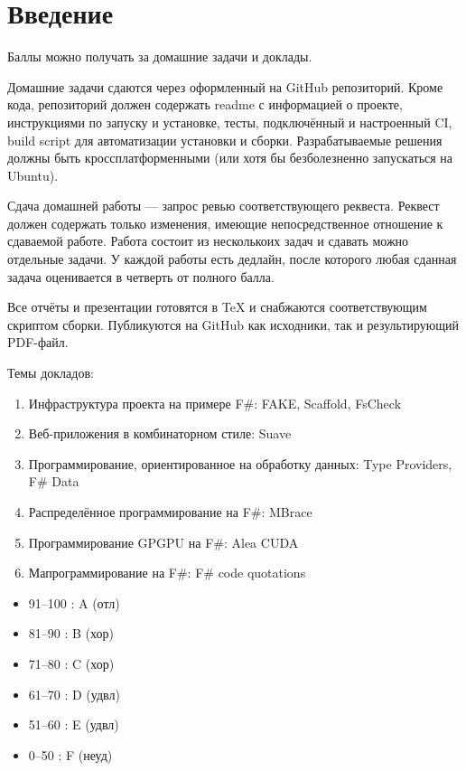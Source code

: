 \section{Введение}

Баллы можно получать за домашние задачи и доклады.

Домашние задачи сдаются через оформленный на GitHub репозиторий. Кроме кода, репозиторий должен содержать readme с информацией о проекте, инструкциями по запуску и установке, тесты, подключённый и настроенный CI, build script для автоматизации установки и сборки. Разрабатываемые решения должны быть кроссплатформенными (или хотя бы безболезненно запускаться на Ubuntu).

Сдача домашней работы --- запрос ревью соответствующего реквеста. Реквест должен содержать только изменения, имеющие непосредственное отношение к сдаваемой работе. Работа состоит из несколькоих задач и сдавать можно отдельные задачи. У каждой работы есть дедлайн, после которого любая сданная задача оценивается в четверть от полного балла.

Все отчёты и презентации готовятся в TeX и снабжаются соответствующим скриптом сборки. Публикуются на GitHub как исходники, так и результирующий PDF-файл.

Темы докладов:
    \begin{enumerate}
    	\item Инфраструктура проекта на примере F\#: FAKE, Scaffold, FsCheck    
    	\item Веб-приложения в комбинаторном стиле: Suave
        \item Программирование, ориентированное на обработку данных: Type Providers, F\# Data
        \item Распределённое программирование на F\#: MBrace  
        \item Программирование GPGPU на F\#: Alea CUDA
    	\item Мапрограммирование на F\#: F\# code quotations
    \end{enumerate}

\begin{itemize}
   \item 91--100 : A (отл)
   \item 81--90 : B (хор)
   \item 71--80 : C (хор)
   \item 61--70 : D (удвл)
   \item 51--60 : E (удвл)
   \item 0--50 : F (неуд)
\end{itemize}